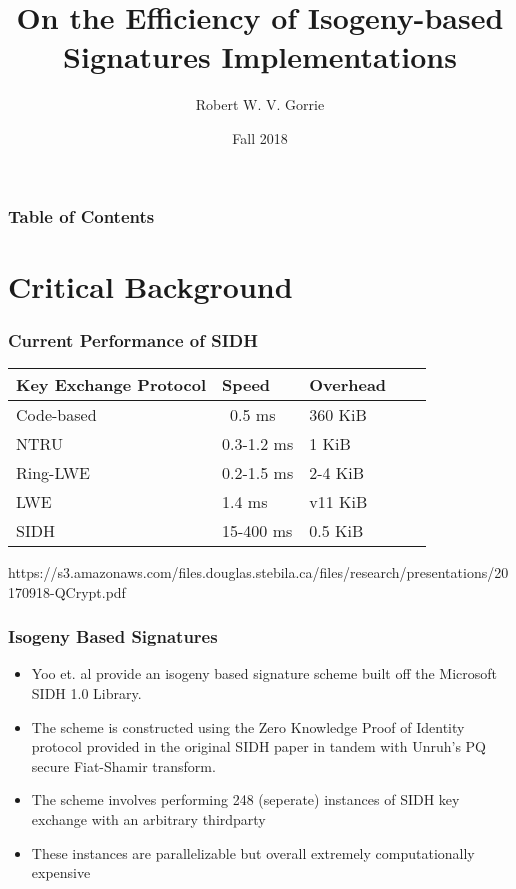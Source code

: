 \documentclass{beamer}
\title[SIDH]{On the Efficiency of Isogeny-based Signatures Implementations}
\author{Robert W. V. Gorrie}
\institute[Comp Sci 2S03]{Department of Computing \& Software, McMaster University}
\date{Fall 2018}
\begin{document}
\begin{frame}
\titlepage
\end{frame}

\begin{frame}
\frametitle{Table of Contents}
\tableofcontents
\end{frame}


\section{Critical Background}


\begin{frame}
\frametitle{Current Performance of SIDH}
\begin{center}
\begin{tabular}{@{}lllll@{}}
	Key Exchange Protocol & Speed & Overhead\\
	\midrule
	Code-based & ~0.5 ms & 360 KiB\\
	NTRU & 0.3-1.2 ms & 1 KiB\\
	Ring-LWE & 0.2-1.5 ms & 2-4 KiB\\
	LWE & 1.4 ms & v11 KiB\\
	\midrule
	SIDH & 15-400 ms & 0.5 KiB\\
\end{tabular}
\begingroup \fontsize{8pt}{8pt}\selectfont
https://s3.amazonaws.com/files.douglas.stebila.ca/files/research/presentations/20170918-QCrypt.pdf
\endgroup
\end{center}
\end{frame}

\begin{frame}
\frametitle{Isogeny Based Signatures}
\begin{itemize}
\item Yoo et. al provide an isogeny based signature scheme built off the Microsoft SIDH 1.0 Library.
\item The scheme is constructed using the Zero Knowledge Proof of Identity protocol provided in the original SIDH paper in tandem with Unruh's PQ secure Fiat-Shamir transform.
\item The scheme involves performing 248 (seperate) instances of SIDH key exchange with an arbitrary thirdparty
\item These instances are parallelizable but overall extremely computationally expensive
\end{itemize}
\end{frame}
\end{document}
